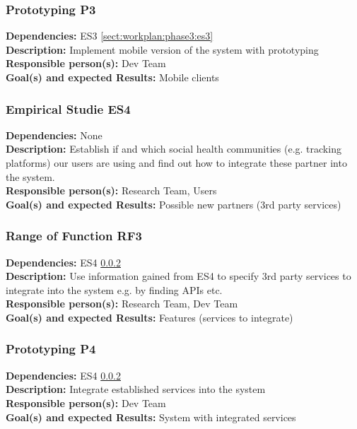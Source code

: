 \documentclass[a4paper,11pt]{article}
\begin{document}
\subsubsection{Prototyping P3}
\label{sect:workplan:phase3:p3}
\textbf{Dependencies:} ES3 \ref{sect:workplan:phase3:es3}\\
\textbf{Description:} Implement mobile version of the system with prototyping\\
\textbf{Responsible person(s):} Dev Team\\
\textbf{Goal(s) and expected Results:} Mobile clients\\

\subsubsection{Empirical Studie ES4}
\label{sect:workplan:phase3:es4}
\textbf{Dependencies:} None\\
\textbf{Description:} Establish if and which social health communities (e.g. tracking platforms) our users are using and find out how to integrate these partner into the system. \\
\textbf{Responsible person(s):} Research Team, Users\\
\textbf{Goal(s) and expected Results:} Possible new partners (3rd party services)\\

\subsubsection{Range of Function RF3}
\label{sect:workplan:phase3:rf3}
\textbf{Dependencies:} ES4 \ref{sect:workplan:phase3:es4}\\
\textbf{Description:} Use information gained from ES4 to specify 3rd party services to integrate into the system e.g. by finding APIs etc.\\
\textbf{Responsible person(s):} Research Team, Dev Team\\
\textbf{Goal(s) and expected Results:} Features (services to integrate)\\

\subsubsection{Prototyping P4}
\label{sect:workplan:phase3:p4}
\textbf{Dependencies:} ES4 \ref{sect:workplan:phase3:es4}\\
\textbf{Description:} Integrate established services into the system\\
\textbf{Responsible person(s):} Dev Team\\
\textbf{Goal(s) and expected Results:} System with integrated services\\
\end{document}
